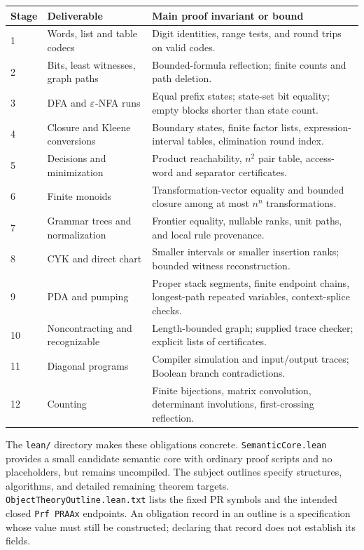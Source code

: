 \begin{longtable}{@{}p{}p{}p{}@{}}
\toprule
Stage & Deliverable & Main proof invariant or bound\\
\midrule\endhead
1 & Words, list and table codecs & Digit identities, range tests, and
round trips on valid codes.\\
2 & Bits, least witnesses, graph paths & Bounded-formula reflection;
finite counts and path deletion.\\
3 & DFA and $\varepsilon$-NFA runs & Equal prefix states; state-set bit equality;
empty blocks shorter than state count.\\
4 & Closure and Kleene conversions & Boundary states, finite factor lists,
expression-interval tables, elimination round index.\\
5 & Decisions and minimization & Product reachability, $n^2$ pair table,
access-word and separator certificates.\\
6 & Finite monoids & Transformation-vector equality and bounded closure
among at most $n^n$ transformations.\\
7 & Grammar trees and normalization & Frontier equality, nullable ranks,
unit paths, and local rule provenance.\\
8 & CYK and direct chart & Smaller intervals or smaller insertion ranks;
bounded witness reconstruction.\\
9 & PDA and pumping & Proper stack segments, finite endpoint chains,
longest-path repeated variables, context-splice checks.\\
10 & Noncontracting and recognizable & Length-bounded graph; supplied
trace checker; explicit lists of certificates.\\
11 & Diagonal programs & Compiler simulation and input/output traces;
Boolean branch contradictions.\\
12 & Counting & Finite bijections, matrix convolution, determinant
involutions, first-crossing reflection.\\
\bottomrule
\end{longtable}

The \texttt{lean/} directory makes these obligations concrete.
\texttt{SemanticCore.lean} provides a small candidate semantic core with
ordinary proof scripts and no placeholders, but remains uncompiled.
The subject outlines specify structures, algorithms, and detailed
remaining theorem targets. \texttt{ObjectTheoryOutline.lean.txt} lists
the fixed PR symbols and the intended closed \texttt{Prf PRAAx} endpoints.
An obligation record in an outline is a specification whose value must
still be constructed; declaring that record does not establish its fields.

